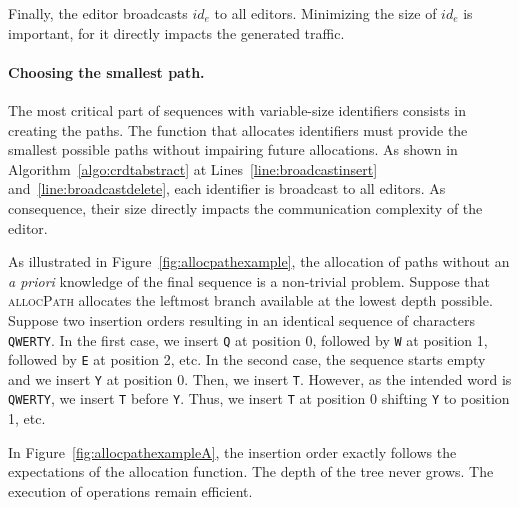 \noindent Finally, the editor broadcasts $id_{e}$ to all editors. Minimizing the
size of $id_e$ is important, for it directly impacts the generated traffic.

\paragraph{Choosing the smallest path.}

The most critical part of sequences with variable-size identifiers consists in
creating the paths. The function that allocates identifiers must provide the
smallest possible paths without impairing future allocations. As shown in
Algorithm~\ref{algo:crdtabstract} at Lines~\ref{line:broadcastinsert}
and~\ref{line:broadcastdelete}, each identifier is broadcast to all editors. As
consequence, their size directly impacts the communication complexity of the
editor.

\begin{figure*}
  \centering
  \hspace{50pt}
  \caption{\label{fig:allocpathexample} Two trees filled with the resulting
    identifiers of two different permutations resulting in an identical sequence
    \texttt{QWERTY}. The function \textsc{allocPath} allocates the leftmost
    branch in the tree. All paths of the optimal case have a length of 1 while
    the tree of the worst case grows up to a depth of 6.}
\end{figure*}

As illustrated in Figure~\ref{fig:allocpathexample}, the allocation of paths
without an \emph{a priori} knowledge of the final sequence is a non-trivial
problem.  Suppose that \textsc{allocPath} allocates the leftmost branch
available at the lowest depth possible. Suppose two insertion orders resulting
in an identical sequence of characters \texttt{QWERTY}.  In the first case, we
insert \texttt{Q} at position 0, followed by \texttt{W} at position 1, followed
by \texttt{E} at position 2, etc.  In the second case, the sequence starts empty
and we insert \texttt{Y} at position 0. Then, we insert \texttt{T}. However, as
the intended word is \texttt{QWERTY}, we insert \texttt{T} before
\texttt{Y}. Thus, we insert \texttt{T} at position 0 shifting \texttt{Y} to
position 1, etc.

In Figure~\ref{fig:allocpathexampleA}, the insertion order exactly follows the
expectations of the allocation function. The depth of the tree never grows. The
execution of operations remain efficient.

